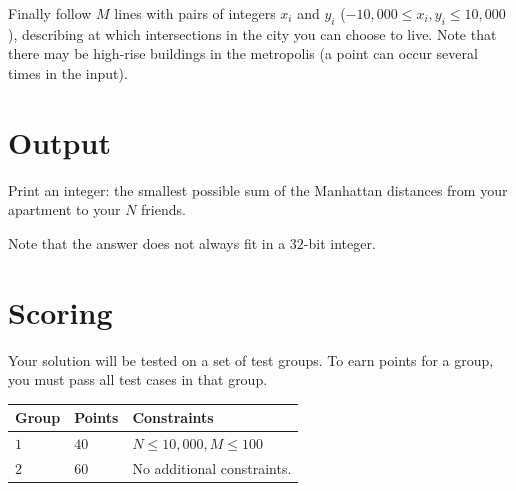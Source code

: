 Finally follow $M$ lines with pairs of integers $x_i$ and $y_i$ ($-10{,}000 \leq x_i, y_i \leq 10{,}000$),
describing at which intersections in the city you can choose to live.
Note that there may be high-rise buildings in the metropolis (a point can occur several times in the input).

\section*{Output}
Print an integer: the smallest possible sum of the Manhattan distances from your apartment to your $N$ friends.

Note that the answer does not always fit in a $32$-bit integer.

\section*{Scoring}
Your solution will be tested on a set of test groups.
To earn points for a group, you must pass all test cases in that group.

\noindent
\begin{tabular}{| l | l | p{12cm} |}
  \hline
  \textbf{Group} & \textbf{Points} & \textbf{Constraints} \\ \hline
  $1$   & $40$       & $N \leq 10{,}000, M \leq 100$ \\ \hline
  $2$   & $60$       & No additional constraints. \\ \hline
\end{tabular}
